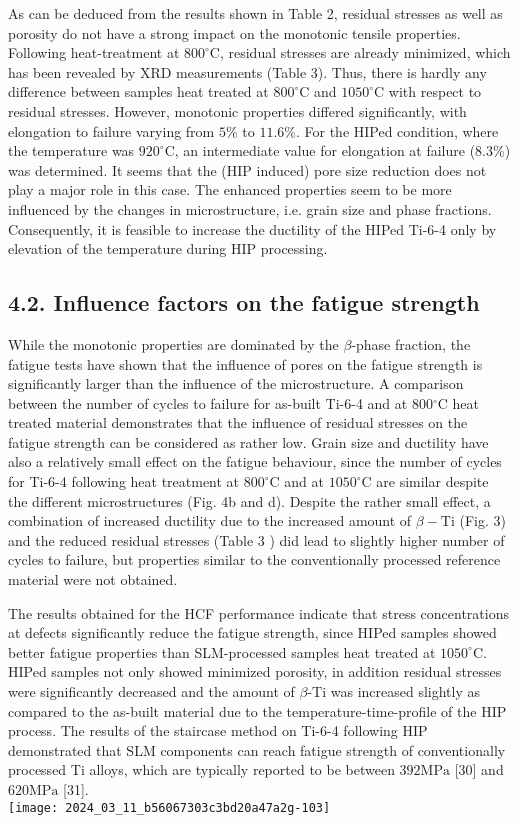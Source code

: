 \documentclass[10pt]{article}
\begin{document}
As can be deduced from the results shown in Table 2, residual stresses as well as porosity do not have a strong impact on the monotonic tensile properties. Following heat-treatment at $800^{\circ} \mathrm{C}$, residual stresses are already minimized, which has been revealed by XRD measurements (Table 3). Thus, there is hardly any difference between samples heat treated at $800^{\circ} \mathrm{C}$ and $1050^{\circ} \mathrm{C}$ with respect to residual stresses. However, monotonic properties differed significantly, with elongation to failure varying from $5 \%$ to $11.6 \%$. For the HIPed condition, where the temperature was $920^{\circ} \mathrm{C}$, an intermediate value for elongation at failure (8.3\%) was determined. It seems that the (HIP induced) pore size reduction does not play a major role in this case. The enhanced properties seem to be more influenced by the changes in microstructure, i.e. grain size and phase fractions. Consequently, it is feasible to increase the ductility of the HIPed Ti-6-4 only by elevation of the temperature during HIP processing.

\subsection*{4.2. Influence factors on the fatigue strength}
While the monotonic properties are dominated by the $\beta$-phase fraction, the fatigue tests have shown that the influence of pores on the fatigue strength is significantly larger than the influence of the microstructure. A comparison between the number of cycles to failure for as-built Ti-6-4 and at $800{ }^{\circ} \mathrm{C}$ heat treated material demonstrates that the influence of residual stresses on the fatigue strength can be considered as rather low. Grain size and ductility have also a relatively small effect on the fatigue behaviour, since the number of cycles for Ti-6-4 following heat treatment at $800^{\circ} \mathrm{C}$ and at $1050^{\circ} \mathrm{C}$ are similar despite the different microstructures (Fig. 4b and d). Despite the rather small effect, a combination of increased ductility due to the increased amount of $\beta-\mathrm{Ti}$ (Fig. 3) and the reduced residual stresses (Table 3 ) did lead to slightly higher number of cycles to failure, but properties similar to the conventionally processed reference material were not obtained.

The results obtained for the HCF performance indicate that stress concentrations at defects significantly reduce the fatigue strength, since HIPed samples showed better fatigue properties than SLM-processed samples heat treated at $1050^{\circ} \mathrm{C}$. HIPed samples not only showed minimized porosity, in addition residual stresses were significantly decreased and the amount of $\beta$-Ti was increased slightly as compared to the as-built material due to the temperature-time-profile of the HIP process. The results of the staircase method on Ti-6-4 following HIP demonstrated that SLM components can reach fatigue strength of conventionally processed Ti alloys, which are typically reported to be between $392 \mathrm{MPa}$ [30] and $620 \mathrm{MPa}$ [31].\\
\texttt{[image: 2024\_03\_11\_b56067303c3bd20a47a2g-103]}
\end{document}
